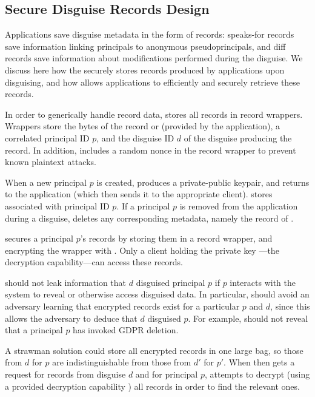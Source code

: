 
\subsection{Secure Disguise Records Design}
Applications save disguise metadata in the form of records: speaks-for records  save information linking
principals to anonymous pseudoprincipals, and diff records  save information about modifications
performed during the disguise.
We discuss here how the \sys securely stores records produced by applications upon disguising, and
how \sys allows applications to efficiently and securely retrieve these records.

In order to generically handle record data, \sys stores all records in record wrappers.
Wrappers store the bytes of the record  or  (provided
by the application), a correlated principal ID $p$, and the disguise ID $d$ of the disguise producing the
record. In addition, \sys includes a random nonce in the record wrapper to prevent known plaintext
attacks.

When a new principal $p$ is created, \sys produces a private-public keypair, and returns  to
the application (which then sends it to the appropriate client). \sys stores  associated
with principal ID $p$.
If a principal $p$ is removed from the application during a disguise, \sys deletes any corresponding metadata, namely
the record of .

\sys secures a principal $p$'s records by storing them in a record wrapper, and encrypting the wrapper
with . Only a client holding the private key ---the decryption
capability---can access these records.

\sys should not leak information that $d$ disguised principal $p$ if $p$ interacts with the system
to reveal or otherwise access disguised data. In particular, \sys should avoid an adversary learning
that encrypted records exist for a particular $p$ and $d$, since this allows the adversary to deduce
that $d$ disguised $p$. For example, \sys should not reveal that a principal $p$ has invoked GDPR
deletion.

A strawman solution could store all encrypted records in one large bag, so those from
$d$ for $p$ are indistinguishable from those from $d'$ for $p'$. When \sys then gets a request for
records from disguise $d$ and for principal $p$, \sys attempts to decrypt (using a provided
decryption capability ) all records in order to find the relevant ones.


